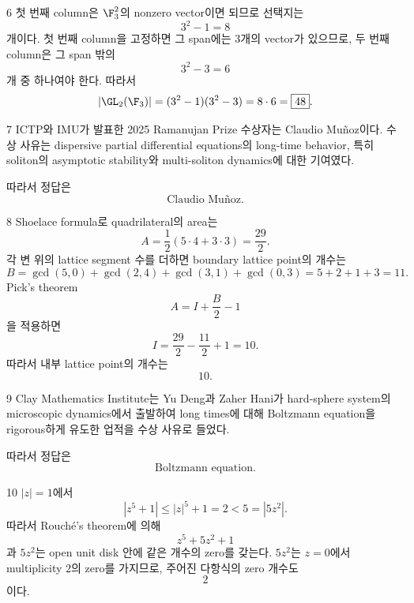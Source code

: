 \documentclass[11pt,oneside]{article}
\begin{document}
\begin{problemsolution}{6}
첫 번째 column은 $\F_3^2$의 nonzero vector이면 되므로 선택지는
\[
    3^2-1=8
\]
개이다. 첫 번째 column을 고정하면 그 span에는 $3$개의 vector가 있으므로, 두 번째 column은 그 span 밖의
\[
    3^2-3=6
\]
개 중 하나여야 한다. 따라서
\[
    |\GL_2(\F_3)|
    =(3^2-1)(3^2-3)
    =8\cdot6
    =\boxed{48}.
\]
\end{problemsolution}

\begin{problemsolution}{7}
ICTP와 IMU가 발표한 2025 Ramanujan Prize 수상자는 Claudio Muñoz이다. 수상 사유는 dispersive partial differential equations의 long-time behavior, 특히 soliton의 asymptotic stability와 multi-soliton dynamics에 대한 기여였다.

따라서 정답은
\[
    \boxed{\text{Claudio Mu\~noz}}.
\]
\end{problemsolution}

\newpage

\begin{problemsolution}{8}
Shoelace formula로 quadrilateral의 area는
\[
    A
    =
    \frac12(5\cdot4+3\cdot3)
    =
    \frac{29}{2}.
\]
각 변 위의 lattice segment 수를 더하면 boundary lattice point의 개수는
\[
    B
    =
    \gcd(5,0)+\gcd(2,4)+\gcd(3,1)+\gcd(0,3)
    =5+2+1+3
    =11.
\]
Pick's theorem
\[
    A=I+\frac{B}{2}-1
\]
을 적용하면
\[
    I
    =
    \frac{29}{2}-\frac{11}{2}+1
    =10.
\]
따라서 내부 lattice point의 개수는
\[
    \boxed{10}.
\]
\end{problemsolution}

\begin{problemsolution}{9}
Clay Mathematics Institute는 Yu Deng과 Zaher Hani가 hard-sphere system의 microscopic dynamics에서 출발하여 long times에 대해 Boltzmann equation을 rigorous하게 유도한 업적을 수상 사유로 들었다.

따라서 정답은
\[
    \boxed{\text{Boltzmann equation}}.
\]
\end{problemsolution}

\begin{problemsolution}{10}
$|z|=1$에서
\[
    |z^5+1|
    \leq
    |z|^5+1
    =2
    <5
    =|5z^2|.
\]
따라서 Rouch\'e's theorem에 의해
\[
    z^5+5z^2+1
\]
과 $5z^2$는 open unit disk 안에 같은 개수의 zero를 갖는다. $5z^2$는 $z=0$에서 multiplicity $2$의 zero를 가지므로, 주어진 다항식의 zero 개수도
\[
    \boxed{2}
\]
이다.
\end{problemsolution}
\end{document}
